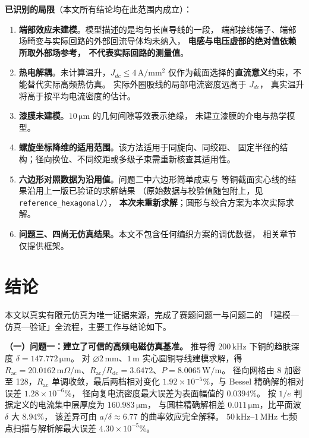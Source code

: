 \documentclass[12pt, a4paper]{ctexart}
\newcommand{\Rac}{R_{\mathrm{ac}}}
\newcommand{\Rdc}{R_{\mathrm{dc}}}
\newcommand{\U}[1]{\ensuremath{\,\mathrm{#1}}}
\newcommand{\Uohm}{\ensuremath{\,\mathrm{m}\Omega/\mathrm{m}}}%
\begin{document}
\textbf{已识别的局限}（本文所有结论均在此范围内成立）：

\begin{enumerate}[label=(\arabic*), leftmargin=2.2em, itemsep=3pt]
\item \textbf{端部效应未建模}。模型描述的是均匀长直导线的一段，
端部接线端子、端部场畸变与实际回路的外部回流导体均未纳入，
\textbf{电感与电压虚部的绝对值依赖所取外部场参考，
不代表实际回路的测量值}。
\item \textbf{热电解耦}。未计算温升，$J_{dc}\le 4\U{A/mm^2}$
仅作为截面选择的\textbf{直流意义}约束，不能替代实际高频热仿真。
实际外圈股线的局部电流密度远高于 $J_{dc}$，
真实温升将高于按平均电流密度的估计。
\item \textbf{漆膜未建模}。$10\U{\mu m}$ 的几何间隙等效表示绝缘，
未建立漆膜的介电与热学模型。
\item \textbf{螺旋坐标降维的适用范围}。该方法适用于同旋向、同绞距、
固定半径的结构；径向换位、不同绞距或多级子束需重新核查其适用性。
\item \textbf{六边形对照数据为沿用值}。问题二中六边形简单成束与
等铜截面实心线的结果沿用上一版已验证的求解结果
（原始数据与校验值随包附上，见 \texttt{reference\_hexagonal/}），
\textbf{本次未重新求解}；圆形与绞合方案为本次实际求解。
\item \textbf{问题三、四尚无仿真结果}。本文不包含任何编织方案的调优数据，
相关章节仅提供框架。
\end{enumerate}

\section{结论}

本文以真实有限元仿真为唯一证据来源，完成了赛题问题一与问题二的
「建模—仿真—验证」全流程，主要工作与结论如下。

\textbf{（一）问题一：建立了可信的高频电磁仿真基准。}
推导得 $200\U{kHz}$ 下铜的趋肤深度 $\delta = 147.772\U{\mu m}$。
对 $\varnothing 2\U{mm}$、$1\U{m}$ 实心圆铜导线建模求解，得
$\Rac = 20.0162\Uohm$、$\Rac/\Rdc = 3.6472$、$P = 8.0065\U{W/m}$。
径向网格由 8 加密至 128，$\Rac$ 单调收敛，最后两档相对变化
$1.92\times10^{-5}\%$，与 Bessel 精确解的相对误差 $1.28\times10^{-6}\%$，
径向复电流密度最大误差为表面幅值的 $0.0394\%$。
按 $1/e$ 判据定义的电流集中层厚度为 $160.983\U{\mu m}$，
与圆柱精确解相差 $0.011\U{\mu m}$，比平面波 $\delta$ 大 $8.94\%$，
该差异可由 $a/\delta\approx6.77$ 的曲率效应完全解释。
$50\U{kHz}$--$1\U{MHz}$ 七频点扫描与解析解最大误差 $4.30\times10^{-5}\%$。
\end{document}
